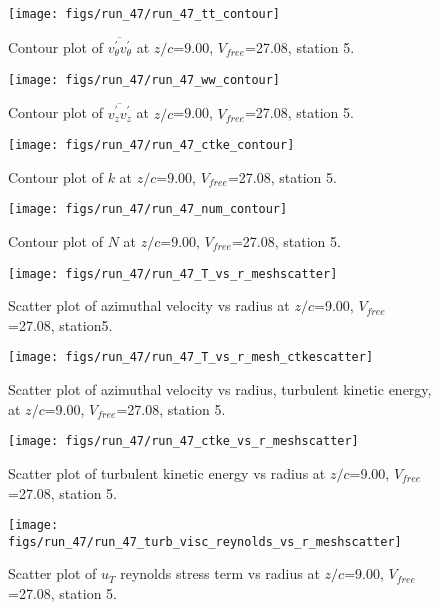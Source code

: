 \begin{figure}[H]
\centering
\texttt{[image: figs/run\_47/run\_47\_tt\_contour]}
\caption{Contour plot of $\overline{v_{\theta}^{\prime} v_{\theta}^{\prime}}$ at $z/c$=9.00, $V_{free}$=27.08, station 5.}
\end{figure}


\begin{figure}[H]
\centering
\texttt{[image: figs/run\_47/run\_47\_ww\_contour]}
\caption{Contour plot of $\overline{v_{z}^{\prime} v_{z}^{\prime}}$ at $z/c$=9.00, $V_{free}$=27.08, station 5.}
\end{figure}


\begin{figure}[H]
\centering
\texttt{[image: figs/run\_47/run\_47\_ctke\_contour]}
\caption{Contour plot of $k$ at $z/c$=9.00, $V_{free}$=27.08, station 5.}
\end{figure}


\begin{figure}[H]
\centering
\texttt{[image: figs/run\_47/run\_47\_num\_contour]}
\caption{Contour plot of $N$ at $z/c$=9.00, $V_{free}$=27.08, station 5.}
\end{figure}


\begin{figure}[H]
\centering
\texttt{[image: figs/run\_47/run\_47\_T\_vs\_r\_meshscatter]}
\caption{Scatter plot of azimuthal velocity vs radius at $z/c$=9.00, $V_{free}$=27.08, station5.}
\end{figure}


\begin{figure}[H]
\centering
\texttt{[image: figs/run\_47/run\_47\_T\_vs\_r\_mesh\_ctkescatter]}
\caption{Scatter plot of azimuthal velocity vs radius, turbulent kinetic energy, at $z/c$=9.00, $V_{free}$=27.08, station 5.}
\end{figure}


\begin{figure}[H]
\centering
\texttt{[image: figs/run\_47/run\_47\_ctke\_vs\_r\_meshscatter]}
\caption{Scatter plot of turbulent kinetic energy vs radius at $z/c$=9.00, $V_{free}$=27.08, station 5.}
\end{figure}


\begin{figure}[H]
\centering
\texttt{[image: figs/run\_47/run\_47\_turb\_visc\_reynolds\_vs\_r\_meshscatter]}
\caption{Scatter plot of $
u_T$ reynolds stress term vs radius at $z/c$=9.00, $V_{free}$=27.08, station 5.}
\end{figure}


